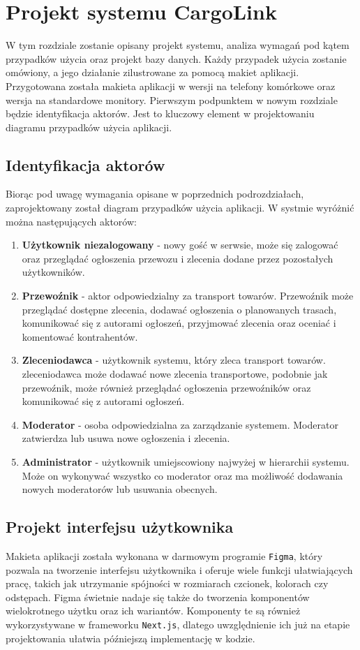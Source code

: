 \chapter{Projekt systemu CargoLink}
W tym rozdziale zostanie opisany projekt systemu, analiza wymagań pod kątem przypadków użycia oraz projekt bazy danych. Każdy przypadek użycia zostanie omówiony, a jego działanie zilustrowane za pomocą makiet aplikacji. Przygotowana została makieta aplikacji w wersji na telefony komórkowe oraz wersja na standardowe monitory. Pierwszym podpunktem w nowym rozdziale będzie identyfikacja aktorów. Jest to kluczowy element w projektowaniu diagramu przypadków użycia aplikacji.

\section{Identyfikacja aktorów}
Biorąc pod uwagę wymagania opisane w poprzednich podrozdziałach, zaprojektowany został diagram przypadków użycia aplikacji. W systmie wyróżnić można następujących aktorów:
\begin{enumerate}
\item \textbf{Użytkownik niezalogowany} - nowy gość w serwsie, może  się zalogować oraz przeglądać ogłoszenia przewozu i zlecenia dodane przez pozostałych użytkowników.
\item \textbf{Przewoźnik} - aktor odpowiedzialny za transport towarów. Przewoźnik może przeglądać dostępne zlecenia, dodawać ogłoszenia o planowanych trasach, komunikować się z autorami ogłoszeń, przyjmować zlecenia oraz oceniać i komentować kontrahentów.
\item \textbf{Zleceniodawca} - użytkownik systemu, który zleca transport towarów. zleceniodawca może dodawać nowe zlecenia transportowe, podobnie jak przewoźnik, może również przeglądać ogłoszenia przewoźników oraz komunikować się z autorami ogłoszeń.
\item \textbf{Moderator} - osoba odpowiedzialna za zarządzanie systemem. Moderator zatwierdza lub usuwa nowe ogłoszenia i zlecenia.
\item \textbf{Administrator} - użytkownik umiejscowiony najwyżej w hierarchii systemu. Może on wykonywać wszystko co moderator oraz ma możliwość dodawania nowych moderatorów lub usuwania obecnych.
\end{enumerate}

\section{Projekt interfejsu użytkownika}
Makieta aplikacji została wykonana w darmowym programie \texttt{Figma}, który pozwala na tworzenie interfejsu użytkownika i oferuje wiele funkcji ułatwiających pracę, takich jak utrzymanie spójności w rozmiarach czcionek, kolorach czy odstępach. Figma świetnie nadaje się także do tworzenia komponentów wielokrotnego użytku oraz ich wariantów. Komponenty te są również wykorzystywane w frameworku \texttt{Next.js}, dlatego uwzględnienie ich już na etapie projektowania ułatwia późniejszą implementację w kodzie.

